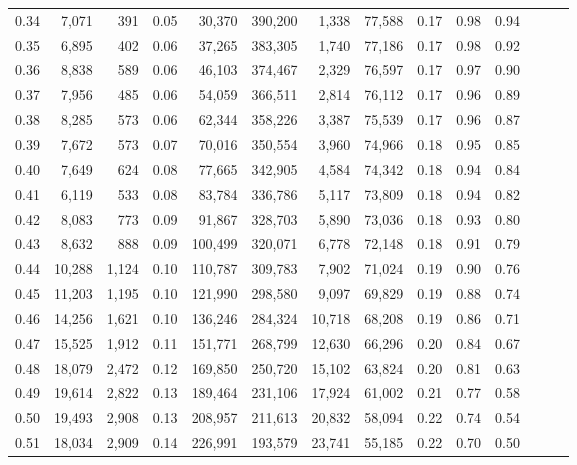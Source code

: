 \begin{tabular}{rrrrrrrrrrrrrr}
0.34 &   7,071 &    391 &  0.05 &   30,370 &  390,200 &   1,338 &  77,588 &  0.17 &  0.98 &      0.94 \\
0.35 &   6,895 &    402 &  0.06 &   37,265 &  383,305 &   1,740 &  77,186 &  0.17 &  0.98 &      0.92 \\
0.36 &   8,838 &    589 &  0.06 &   46,103 &  374,467 &   2,329 &  76,597 &  0.17 &  0.97 &      0.90 \\
0.37 &   7,956 &    485 &  0.06 &   54,059 &  366,511 &   2,814 &  76,112 &  0.17 &  0.96 &      0.89 \\
0.38 &   8,285 &    573 &  0.06 &   62,344 &  358,226 &   3,387 &  75,539 &  0.17 &  0.96 &      0.87 \\
0.39 &   7,672 &    573 &  0.07 &   70,016 &  350,554 &   3,960 &  74,966 &  0.18 &  0.95 &      0.85 \\
0.40 &   7,649 &    624 &  0.08 &   77,665 &  342,905 &   4,584 &  74,342 &  0.18 &  0.94 &      0.84 \\
0.41 &   6,119 &    533 &  0.08 &   83,784 &  336,786 &   5,117 &  73,809 &  0.18 &  0.94 &      0.82 \\
0.42 &   8,083 &    773 &  0.09 &   91,867 &  328,703 &   5,890 &  73,036 &  0.18 &  0.93 &      0.80 \\
0.43 &   8,632 &    888 &  0.09 &  100,499 &  320,071 &   6,778 &  72,148 &  0.18 &  0.91 &      0.79 \\
0.44 &  10,288 &  1,124 &  0.10 &  110,787 &  309,783 &   7,902 &  71,024 &  0.19 &  0.90 &      0.76 \\
0.45 &  11,203 &  1,195 &  0.10 &  121,990 &  298,580 &   9,097 &  69,829 &  0.19 &  0.88 &      0.74 \\
0.46 &  14,256 &  1,621 &  0.10 &  136,246 &  284,324 &  10,718 &  68,208 &  0.19 &  0.86 &      0.71 \\
0.47 &  15,525 &  1,912 &  0.11 &  151,771 &  268,799 &  12,630 &  66,296 &  0.20 &  0.84 &      0.67 \\
0.48 &  18,079 &  2,472 &  0.12 &  169,850 &  250,720 &  15,102 &  63,824 &  0.20 &  0.81 &      0.63 \\
0.49 &  19,614 &  2,822 &  0.13 &  189,464 &  231,106 &  17,924 &  61,002 &  0.21 &  0.77 &      0.58 \\
0.50 &  19,493 &  2,908 &  0.13 &  208,957 &  211,613 &  20,832 &  58,094 &  0.22 &  0.74 &      0.54 \\
0.51 &  18,034 &  2,909 &  0.14 &  226,991 &  193,579 &  23,741 &  55,185 &  0.22 &  0.70 &      0.50 \\

\end{tabular}

